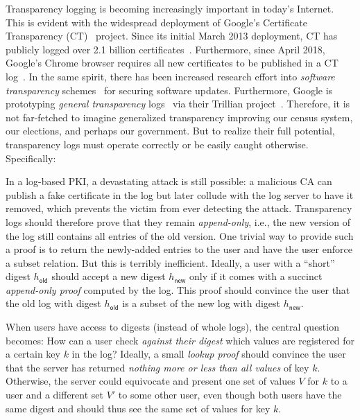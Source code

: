 Transparency logging is becoming increasingly important in today's Internet.
This is evident with the widespread deployment of Google's Certificate Transparency (CT)~\cite{ct} project.
Since its initial March 2013 deployment, CT has publicly logged over 2.1 billion certificates~\cite{ct-num-certs}.
Furthermore, since April 2018, Google's Chrome browser requires all new certificates to be published in a CT log~\cite{ct-google-chrome}.
In the same spirit, there has been increased research effort into \textit{software transparency} schemes~\cite{contour,at,chainiac,software-dist-transparency,catena,cosi} for securing software updates.
Furthermore, Google is prototyping \textit{general transparency} logs~\cite{general-transparency,trillian} via their Trillian project~\cite{trillian}.
Therefore, it is not far-fetched to imagine generalized transparency improving our census system, our elections, and perhaps our government.
But to realize their full potential, transparency logs must operate correctly or be easily caught otherwise.
Specifically:

In a log-based PKI, a devastating attack is still possible: a malicious CA can publish a fake certificate in the log but later collude with the log server to have it removed, which prevents the victim from ever detecting the attack.
Transparency logs should therefore prove that they remain \emph{append-only}, i.e., the new version of the log still contains all entries of the old version.
One trivial way to provide such a proof is to return the newly-added entries to the user and have the user enforce a subset relation.
But this is terribly inefficient.
Ideally, a user with a ``short'' digest $h_{\mathsf{old}}$ should accept a new digest $h_{\mathsf{new}}$ only if it comes with a succinct \emph{append-only proof} computed by the log.
This proof should convince the user that the old log with digest $h_{\mathsf{old}}$ is a subset of the new log with digest $h_{\mathsf{new}}$.

When users have access to digests (instead of whole logs), the central question becomes: 
How can a user check \textit{against their digest} which values are registered for a certain key $k$ in the log?
Ideally, a small \emph{lookup proof} should convince the user that the server has returned \textit{nothing more or less than all values} of key $k$.
Otherwise, the server could equivocate and present one set of values $V$ for $k$ to a user and a different set $V'$ to some other user, even though both users have the same digest and should thus see the same set of values for key $k$.

